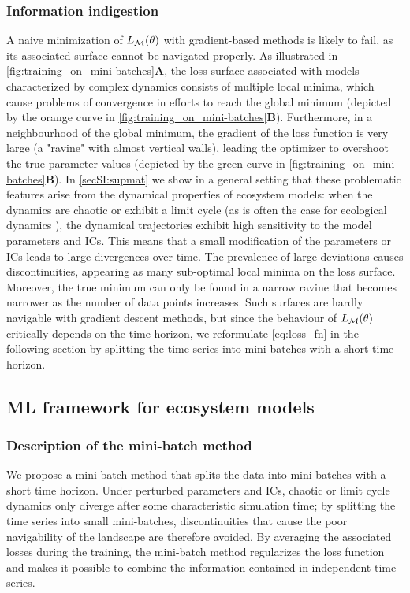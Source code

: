 \subsubsection{Information indigestion}
A naive minimization of $L_{\mathcal{M}}(\theta)$ with gradient-based methods is likely to fail, as its associated surface cannot be navigated properly. As illustrated in \cref{fig:training_on_mini-batches}\textbf{A}, the loss surface associated with models characterized by complex dynamics consists of multiple local minima, which cause problems of convergence in efforts to reach the global minimum (depicted by the orange curve in \cref{fig:training_on_mini-batches}\textbf{B}). Furthermore, in a neighbourhood of the global minimum, the gradient of the loss function is very large (a "ravine" with almost vertical walls), leading the optimizer to overshoot the true parameter values (depicted by the green curve in \cref{fig:training_on_mini-batches}\textbf{B}).
%
In \cref{secSI:supmat} we show in a general setting that these problematic features arise from the dynamical properties of ecosystem models: when the dynamics are chaotic or exhibit a limit cycle (as is often the case for ecological dynamics \citep{Bjornstad2001,Hastings1993,Huisman1999,Beninca2008}), the dynamical trajectories exhibit high sensitivity to the model parameters and ICs. This means that a small modification of the parameters or ICs leads to large divergences over time. 
%
The prevalence of large deviations causes discontinuities, appearing as many sub-optimal local minima on the loss surface. Moreover, the true minimum can only be found in a narrow ravine that becomes narrower as the number of data points increases.
% 
Such surfaces are hardly navigable with gradient descent methods, but since the behaviour of $L_{\mathcal{M}}(\theta)$ critically depends on the time horizon, we reformulate \cref{eq:loss_fn} in the following section by splitting the time series into mini-batches with a short time horizon. 

\subsection{ML framework for ecosystem models}

\subsubsection{Description of the mini-batch method}
We propose a mini-batch method that splits the data into mini-batches with a short time horizon. Under perturbed parameters and ICs, chaotic or limit cycle dynamics only diverge after some characteristic simulation time; by splitting the time series into small mini-batches, discontinuities that cause the poor navigability of the landscape are therefore avoided. By averaging the associated losses during the training, the mini-batch method regularizes the loss function and makes it possible to combine the information contained in independent time series.

